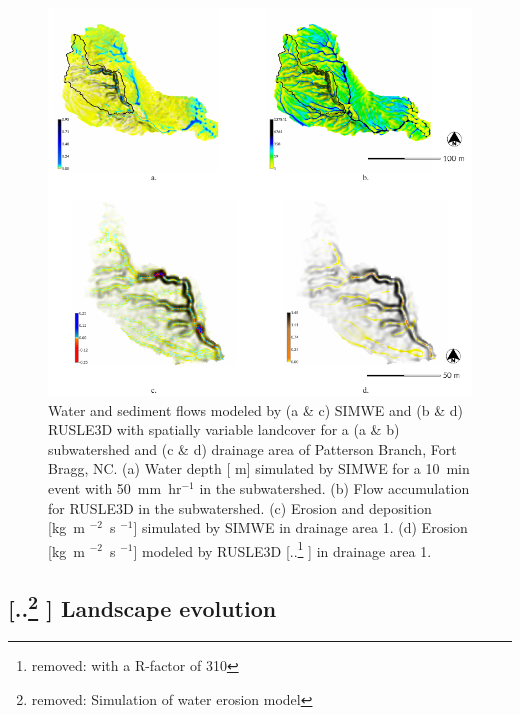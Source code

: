 \documentclass[gmd, manuscript]{copernicus}
\providecommand{\DIFadd}[1]{{\protect\color{blue} \sf #1}} %
\providecommand{\DIFdel}[1]{{\protect\color{red} [..\footnote{removed: #1} ]}} %
\providecommand{\DIFaddbegin}{} %
\providecommand{\DIFaddend}{} %
\providecommand{\DIFdelbegin}{} %
\providecommand{\DIFdelend}{} %
\providecommand{\DIFaddFL}[1]{\DIFadd{#1}} %
\providecommand{\DIFdelFL}[1]{\DIFdel{#1}} %
\providecommand{\DIFaddbeginFL}{} %
\providecommand{\DIFaddendFL}{} %
\providecommand{\DIFdelbeginFL}{} %
\providecommand{\DIFdelendFL}{} %
\begin{document}
\begin{figure}
\center
\includegraphics[width=\textwidth,height=0.95\textheight,keepaspectratio]{figures/models.pdf}
\caption{Water and sediment flows 
\DIFaddbeginFL \DIFaddFL{modeled by (a \& c) SIMWE and (b \& d) RUSLE3D with spatially variable landcover 
for a (a \& b) subwatershed and (c \& d) drainage area of Patterson Branch, Fort Bragg, NC.
(a) Water depth }[\DIFaddFL{m}] \DIFaddendFL simulated by SIMWE for a 10~\unit{min} event with 50~\unit{mm~hr}$^{-1}$ \DIFaddbeginFL \DIFaddFL{in the subwatershed.
(b) Flow accumulation for RUSLE3D in the subwatershed.
(c) Erosion }\DIFaddendFL and \DIFaddbeginFL \DIFaddFL{deposition }[\unit{kg~m}\DIFaddFL{$^{-2}$~}\unit{s}\DIFaddFL{$^{-1}$}] \DIFaddFL{simulated by SIMWE in drainage area 1.
(d) Erosion }[\unit{kg~m}\DIFaddFL{$^{-2}$~}\unit{s}\DIFaddFL{$^{-1}$}] \DIFaddFL{modeled }\DIFaddendFL by RUSLE3D \DIFdelbeginFL \DIFdelFL{with a R-factor of 310
}\DIFdelendFL \DIFaddbeginFL \DIFaddFL{in drainage area 1.
}\DIFaddendFL }
\label{fig:models}
\end{figure}

\DIFaddbegin 

\DIFaddend \subsection{\DIFdelbegin \DIFdel{Simulation of water erosion model}\DIFdelend \DIFaddbegin \DIFadd{Landscape evolution}\DIFaddend }
\DIFaddbegin 
\end{document}
